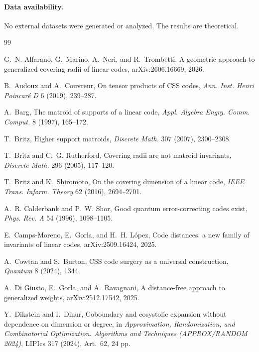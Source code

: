 \documentclass[11pt,letterpaper]{article}
\theoremstyle{plain}
\theoremstyle{definition}
\newcommand{\1}{\mathbf{1}}
\begin{document}
\paragraph{Data availability.}
No external datasets were generated or analyzed.  The results are theoretical.


\begin{thebibliography}{99}
\small
\setlength{\itemsep}{0pt}
\setlength{\parsep}{0pt}

G.~N. Alfarano, G.~Marino, A.~Neri, and R.~Trombetti,
\newblock A geometric approach to generalized covering radii of linear codes,
\newblock arXiv:2606.16669, 2026.

B.~Audoux and A.~Couvreur,
\newblock On tensor products of CSS codes,
\newblock \emph{Ann. Inst. Henri Poincar\'e D} 6 (2019), 239--287.

A.~Barg,
\newblock The matroid of supports of a linear code,
\newblock \emph{Appl. Algebra Engrg. Comm. Comput.} 8 (1997), 165--172.

T.~Britz,
\newblock Higher support matroids,
\newblock \emph{Discrete Math.} 307 (2007), 2300--2308.

T.~Britz and C.~G. Rutherford,
\newblock Covering radii are not matroid invariants,
\newblock \emph{Discrete Math.} 296 (2005), 117--120.

T.~Britz and K.~Shiromoto,
\newblock On the covering dimension of a linear code,
\newblock \emph{IEEE Trans. Inform. Theory} 62 (2016), 2694--2701.

A.~R. Calderbank and P.~W. Shor,
\newblock Good quantum error-correcting codes exist,
\newblock \emph{Phys. Rev. A} 54 (1996), 1098--1105.

E.~Camps-Moreno, E.~Gorla, and H.~H. L\'opez,
\newblock Code distances: a new family of invariants of linear codes,
\newblock arXiv:2509.16424, 2025.

A.~Cowtan and S.~Burton,
\newblock CSS code surgery as a universal construction,
\newblock \emph{Quantum} 8 (2024), 1344.

A.~Di Giusto, E.~Gorla, and A.~Ravagnani,
\newblock A distance-free approach to generalized weights,
\newblock arXiv:2512.17542, 2025.

Y.~Dikstein and I.~Dinur,
\newblock Coboundary and cosystolic expansion without dependence on dimension or degree,
\newblock in \emph{Approximation, Randomization, and Combinatorial Optimization.
Algorithms and Techniques (APPROX/RANDOM 2024)}, LIPIcs 317 (2024), Art.~62, 24 pp.


\end{thebibliography}
\end{document}
